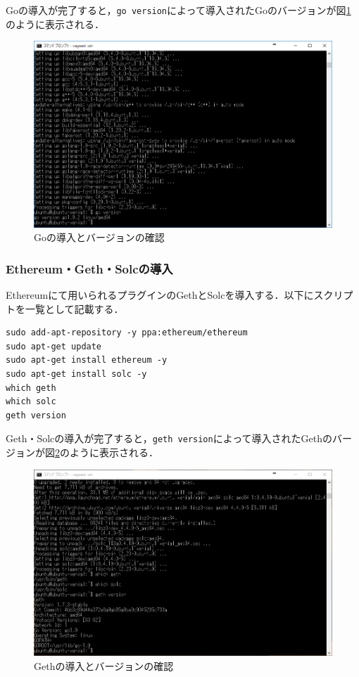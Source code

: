 Goの導入が完了すると，\texttt{go version}によって導入されたGoのバージョンが図\ref{go}のように表示される．

\begin{figure}[htb]
\centering
\includegraphics[width=12cm]{images/go.png}
\caption{Goの導入とバージョンの確認}\label{go}
\end{figure}

\subsubsection{Ethereum・Geth・Solcの導入}
Ethereumにて用いられるプラグインのGethとSolcを導入する．以下にスクリプトを一覧として記載する．
\begin{verbatim}
sudo add-apt-repository -y ppa:ethereum/ethereum
sudo apt-get update
sudo apt-get install ethereum -y
sudo apt-get install solc -y
which geth 
which solc
geth version
\end{verbatim}

Geth・Solcの導入が完了すると，\texttt{geth version}によって導入されたGethのバージョンが図\ref{geth}のように表示される．

\begin{figure}[htb]
\centering
\includegraphics[width=12cm]{images/geth.png}
\caption{Gethの導入とバージョンの確認}\label{geth}
\end{figure}

